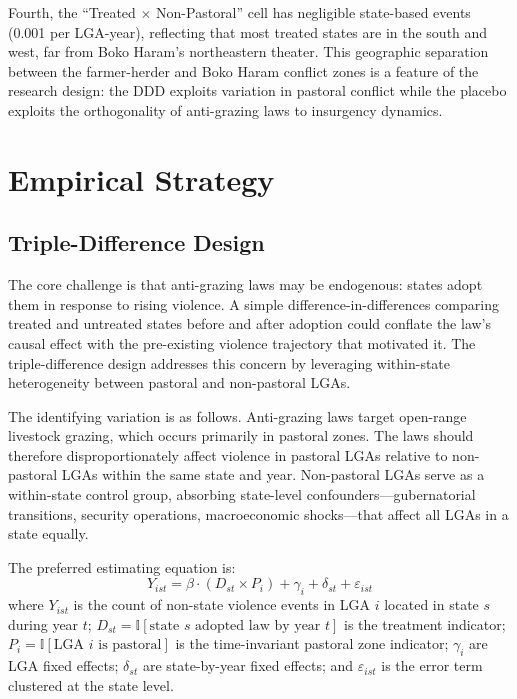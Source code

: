 \documentclass[12pt]{article}
\newcommand{\ind}{\mathbb{I}}
\begin{document}
Fourth, the ``Treated $\times$ Non-Pastoral'' cell has negligible state-based events (0.001 per LGA-year), reflecting that most treated states are in the south and west, far from Boko Haram's northeastern theater. This geographic separation between the farmer-herder and Boko Haram conflict zones is a feature of the research design: the DDD exploits variation in pastoral conflict while the placebo exploits the orthogonality of anti-grazing laws to insurgency dynamics.




\section{Empirical Strategy}

\subsection{Triple-Difference Design}

The core challenge is that anti-grazing laws may be endogenous: states adopt them in response to rising violence. A simple difference-in-differences comparing treated and untreated states before and after adoption could conflate the law's causal effect with the pre-existing violence trajectory that motivated it. The triple-difference design addresses this concern by leveraging within-state heterogeneity between pastoral and non-pastoral LGAs.

The identifying variation is as follows. Anti-grazing laws target open-range livestock grazing, which occurs primarily in pastoral zones. The laws should therefore disproportionately affect violence in pastoral LGAs relative to non-pastoral LGAs within the same state and year. Non-pastoral LGAs serve as a within-state control group, absorbing state-level confounders---gubernatorial transitions, security operations, macroeconomic shocks---that affect all LGAs in a state equally.

The preferred estimating equation is:
\begin{equation}
Y_{ist} = \beta \cdot (D_{st} \times P_i) + \gamma_{i} + \delta_{st} + \varepsilon_{ist}
\label{eq:ddd}
\end{equation}
where $Y_{ist}$ is the count of non-state violence events in LGA $i$ located in state $s$ during year $t$; $D_{st} = \ind[\text{state } s \text{ adopted law by year } t]$ is the treatment indicator; $P_i = \ind[\text{LGA } i \text{ is pastoral}]$ is the time-invariant pastoral zone indicator; $\gamma_i$ are LGA fixed effects; $\delta_{st}$ are state-by-year fixed effects; and $\varepsilon_{ist}$ is the error term clustered at the state level.
\end{document}
